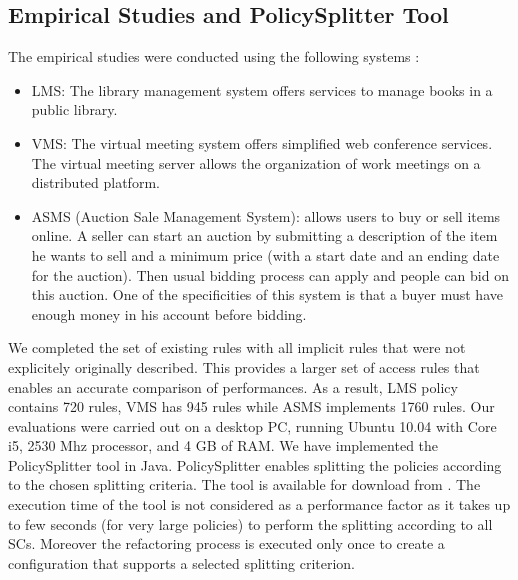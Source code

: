 \subsection{Empirical Studies and PolicySplitter Tool}
The empirical studies were conducted using the following systems \cite{testcase}:
\begin{itemize}	
\item LMS: The library management system offers services to manage books in a public library.
\item VMS: The virtual meeting system offers simplified web conference services. The virtual meeting server allows the organization of work meetings on 
a distributed platform.
\item ASMS (Auction Sale Management System): allows users to buy or sell items online. A seller can start an auction by submitting a description of the
item he wants to sell and a minimum price (with a start date and an ending date for the auction). Then usual bidding process can apply and people can bid 
on this auction. One of the specificities of this system is that a buyer must have enough money in his account before bidding.
\end{itemize}
We completed the set of existing rules with all implicit rules that were not explicitely originally described. This provides a larger set of access rules that enables
an accurate comparison of performances. As a result, LMS policy contains 720 rules, 
VMS has 945 rules while ASMS implements 1760 rules. 
Our evaluations were carried out on a desktop PC, 
running Ubuntu 10.04 with Core i5, 2530 Mhz processor, and 4 GB of RAM. 
We have implemented the PolicySplitter tool in Java. PolicySplitter enables splitting the policies according to the chosen splitting criteria. 
The tool is available for download from \cite{splitter}.
The execution time of the tool is not considered as a performance factor as it takes up to few seconds (for very large policies) to perform the splitting 
according to all SCs. Moreover the refactoring process is executed only once to create a configuration that supports a selected splitting criterion.


